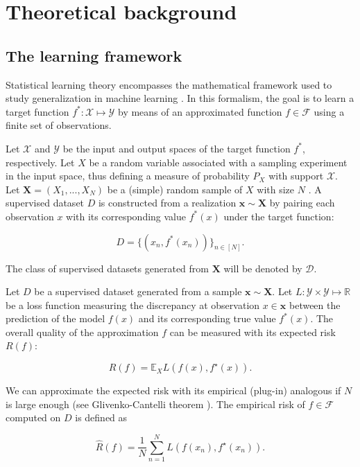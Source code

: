 \chapter{Theoretical background }\label{sec:theory}

\section{The learning framework}

Statistical learning theory encompasses the mathematical framework used to
study generalization in machine learning
\cite{n.vapnikNatureStatisticalLearning2000}.
In this formalism, the goal
is to learn a target function $f^*: \mathcal{X} \longmapsto \mathcal{Y}$ 
by means of an approximated function $f \in \mathcal{F}$ using a 
finite set of observations. 

\begin{definition}\label{def:dataset}
    Let $\mathcal{X}$ and $\mathcal{Y}$ be
    the input and output spaces of the target function $f^*$, respectively. Let $X$ 
    be a random variable associated with a sampling experiment in the input space, thus 
    defining a measure of probability $P_X$ with support $\mathcal{X}$.
    Let $\bm{X} = (X_1, ..., X_N)$ be a (simple)
    random sample of $X$ with size $N$ \cite{casellaStatisticalInference2002}.
    A supervised dataset $D$ is constructed from a realization
    $\bm{x} \sim \bm{X}$ by pairing each observation $x$ with its corresponding
    value $f^*(x)$ under the target function:

    $$
    D = \{(x_n, f^*(x_n))\}_{n \in [N]}.
    $$

    The class of supervised datasets generated from $\bm{X}$ will be denoted by $\mathcal{D}$.
\end{definition}

\begin{definition}\label{def:erm}
    Let $D$ be a supervised dataset generated from a sample $\bm{x} \sim \bm{X}$. 
    Let $L: \mathcal{Y} \times \mathcal{Y} \longmapsto \mathbb{R}$ be a loss function 
    measuring the discrepancy at observation $x \in \bm{x}$ between the prediction of the model $f(x)$ and 
    its corresponding true value $f^*(x)$. The overall quality of the approximation $f$ can be 
    measured with its expected risk $R(f)$:

    $$
    R(f)=\mathbb{E}_{X} L(f(x),f^\star(x)).
    $$

    We can approximate the expected risk with its empirical (plug-in)
    analogous if $N$ is large enough (see Glivenko-Cantelli 
    theorem \cite{gutIntermediateCourseProbability2009}).
    The empirical risk of $f \in \mathcal{F}$ computed on $D$ is defined as

    $$
    \hat{R}(f)=\frac{1}{N}\sum_{n=1}^{N}L(f(x_{n}),f^{\star}(x_{n})).
    $$
\end{definition}

